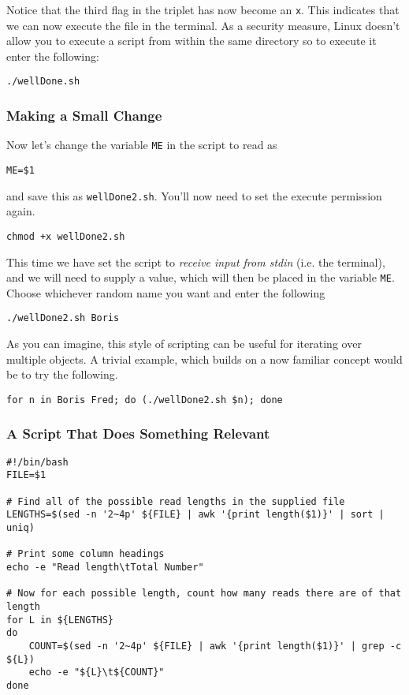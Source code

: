 \begin{steps}
Notice that the third flag in the triplet has now become an \texttt{x}.
This indicates that we can now execute the file in the terminal.
As a security measure, Linux doesn't allow you to execute a script from within the same directory so to execute it enter the following:
\begin{lstlisting}
./wellDone.sh
\end{lstlisting}
\end{steps}

\subsubsection{Making a Small Change}

\begin{steps}
Now let's change the variable \texttt{ME} in the script to read as
\begin{lstlisting}
ME=$1
\end{lstlisting}
and save this as \texttt{wellDone2.sh}.
You'll now need to set the execute permission again.
\begin{lstlisting}
chmod +x wellDone2.sh
\end{lstlisting}
\end{steps}

\begin{information}
This time we have set the script to \textit{receive input from stdin} (i.e. the terminal), and we will need to supply a value, which will then be placed in the variable \texttt{ME}.
Choose whichever random name you want and enter the following
\begin{lstlisting}
./wellDone2.sh Boris
\end{lstlisting}
\end{information}

\begin{advanced}
As you can imagine, this style of scripting can be useful for iterating over multiple objects.
A trivial example, which builds on a now familiar concept would be to try the following.
\begin{lstlisting}
for n in Boris Fred; do (./wellDone2.sh $n); done
\end{lstlisting}
\end{advanced}

\subsubsection*{A Script That Does Something Relevant}
\begin{lstlisting}[style=command_syntax]
#!/bin/bash
FILE=$1

# Find all of the possible read lengths in the supplied file
LENGTHS=$(sed -n '2~4p' ${FILE} | awk '{print length($1)}' | sort | uniq)

# Print some column headings
echo -e "Read length\tTotal Number"

# Now for each possible length, count how many reads there are of that length
for L in ${LENGTHS}
do
	COUNT=$(sed -n '2~4p' ${FILE} | awk '{print length($1)}' | grep -c ${L})
	echo -e "${L}\t${COUNT}" 
done
\end{lstlisting}

